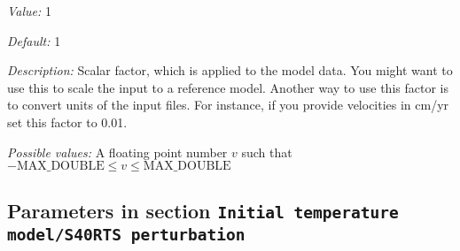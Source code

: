 \begin{itemize}
{\it Value:} 1


{\it Default:} 1


{\it Description:} Scalar factor, which is applied to the model data. You might want to use this to scale the input to a reference model. Another way to use this factor is to convert units of the input files. For instance, if you provide velocities in cm/yr set this factor to 0.01.


{\it Possible values:} A floating point number $v$ such that $-\text{MAX\_DOUBLE} \leq v \leq \text{MAX\_DOUBLE}$
\end{itemize}

\subsection{Parameters in section \tt Initial temperature model/S40RTS perturbation}
\label{parameters:Initial_20temperature_20model/S40RTS_20perturbation}

